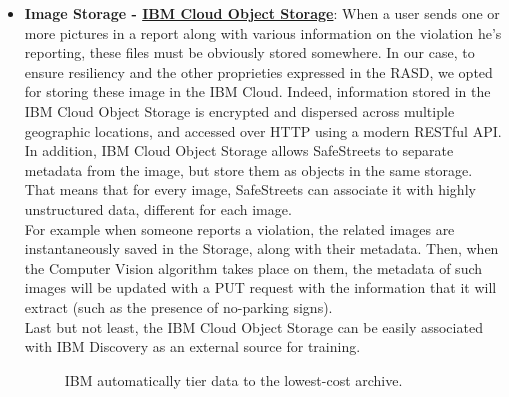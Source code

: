 \begin{itemize}
	\item \textbf{Image Storage - \href{https://cloud.ibm.com/catalog/services/cloud-object-storage}{IBM Cloud Object Storage}}: When a user sends one or more pictures in a report along with various information on the violation he's reporting, these files must be obviously stored somewhere. In our case, to ensure  resiliency and the other proprieties expressed in the RASD, we opted for storing these image in the IBM Cloud. Indeed, information stored in the IBM Cloud Object Storage is encrypted and dispersed across multiple geographic locations, and accessed over HTTP using a modern RESTful API.
	In addition, IBM Cloud Object Storage allows SafeStreets to separate metadata from the image, but store them as objects in the same storage. That means that for every image, SafeStreets can associate it with highly unstructured data, different for each image. 
	\\For example when someone reports a violation, the related images are instantaneously saved in the Storage, along with their metadata. Then, when the Computer Vision algorithm takes place on them, the metadata of such images will be updated with a PUT request with the information that it will extract (such as the presence of no-parking signs).
	\\Last but not least, the IBM Cloud Object Storage can be easily associated with IBM Discovery as an external source for training.
	\begin{figure}[h!]
		\caption{IBM automatically tier data to the lowest-cost archive.}
	\end{figure}
	\FloatBarrier
	

\end{itemize}
